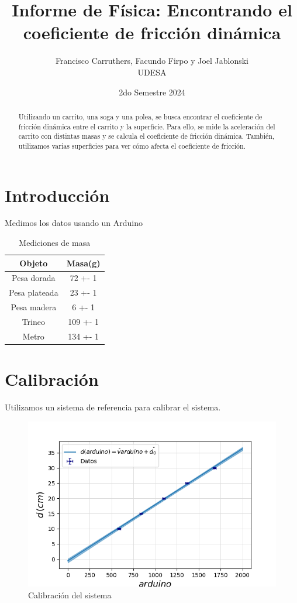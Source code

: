 \documentclass[12pt,a4]{article}
\title{Informe de Física: Encontrando el coeficiente de fricción dinámica}
\author{Francisco Carruthers, Facundo Firpo y Joel Jablonski\\ [2mm] %
\small UDESA}
\date{2do Semestre 2024}
\begin{document}
\maketitle

\begin{abstract}
    Utilizando un carrito, una soga y una polea, se busca encontrar el coeficiente de fricción dinámica entre el carrito y la superficie. Para ello, se mide la aceleración del carrito con distintas masas y se calcula el coeficiente de fricción dinámica. También, utilizamos varias superficies para ver cómo afecta el coeficiente de fricción.
\end{abstract}

\section{Introducción}

Medimos los datos usando un Arduino

\begin{table}
    \centering
    \begin{tabular}{|c|c|}
        \hline
        \textbf{Objeto} & \textbf{Masa(g)} \\
        \hline
        Pesa dorada & 72 +- 1 \\
        Pesa plateada & 23 +- 1 \\
        Pesa madera & 6 +- 1 \\
        Trineo & 109 +- 1 \\
        Metro & 134 +- 1 \\
        \hline
    \end{tabular}
    \caption{Mediciones de masa}
    \label{tab:mediciones}
\end{table}

\newpage
\section{Calibración}

Utilizamos un sistema de referencia para calibrar el sistema.

\begin{figure}[H]
    \centering
    \includegraphics[width=0.9\linewidth]{Calibracion.png}
    \caption{Calibración del sistema}
    \label{fig:calibracion}
\end{figure}
\end{document}
